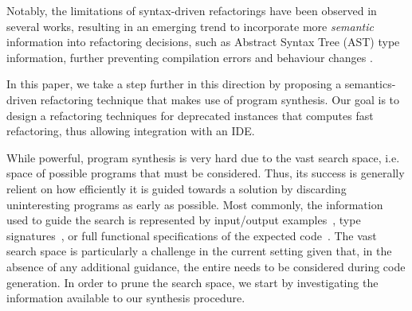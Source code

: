 \documentclass[runningheads,a4paper]{llncs}
\begin{document}
%
%
Notably, the limitations of syntax-driven refactorings have been observed
in several works, resulting in an emerging trend to incorporate more {\em semantic}
information into refactoring decisions, such as Abstract Syntax Tree (AST) 
type information,
further preventing compilation errors and behaviour changes
\cite{Steimann2011,Steimann2012Pilgrim,Steimann2011KollePilgrim}.

In this paper, we take a step further in this direction by proposing a
semantics-driven refactoring technique that makes use of program synthesis.
Our goal is to design a refactoring techniques for deprecated instances that computes fast refactoring, thus allowing integration with an IDE.


While powerful, program synthesis is very hard due to the vast search space, i.e. space of possible programs that must be considered. Thus, its success is generally relient on how efficiently it is guided towards a solution by discarding uninteresting programs as early as possible. Most commonly, the information used to guide the search is represented by input/output examples~\cite{}, type signatures~\cite{}, or full functional specifications of the expected code~\cite{}.
%
The vast search space is particularly a challenge in the current setting given that, in the absence of any additional guidance, the entire  needs to be considered during code generation.
In order to prune the search space, we start by investigating the information available to our synthesis procedure.
\end{document}

